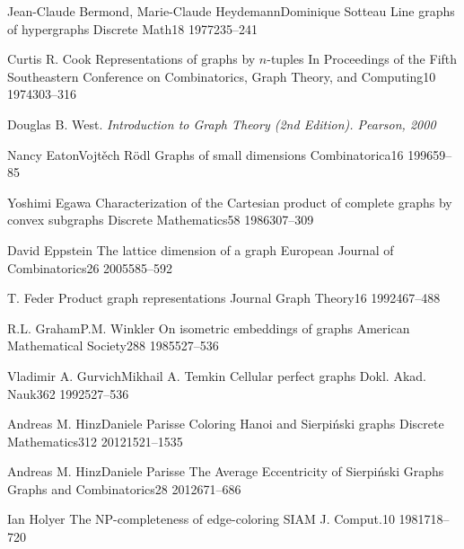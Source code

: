 \documentclass[12pt,a4paper,titlepage,openany]{report}
\begin{document}
 \begin{thebibliography}{99}
\thispagestyle{fancy}

  \articleInJournalManyAuthors
    {Jean-Claude Bermond, Marie-Claude Heydemann}{Dominique Sotteau}
    {Line graphs of hypergraphs}
   {Discrete Math}{18}
   {1977}{235--241} 


  \articleInJournalOneAuthor
    {Curtis R. Cook}
    {Representations of graphs by $n$-tuples}
   {In Proceedings of the Fifth Southeastern Conference on Combinatorics, Graph Theory, and Computing}{10}
   {1974}{303--316}
   
  Douglas B. West. \textit{Introduction to Graph Theory (2nd Edition). Pearson, 2000}

  \articleInJournalManyAuthors
    {Nancy Eaton}{Vojt\v ech R\" odl}
    {Graphs of small dimensions}
   {Combinatorica}{16}
   {1996}{59--85}

  \articleInJournalOneAuthor
    {Yoshimi Egawa}
    {Characterization of the Cartesian product of complete graphs by convex subgraphs}
   {Discrete Mathematics}{58}
   {1986}{307--309}     

\articleInJournalOneAuthor
    {David Eppstein}
    {The lattice dimension of a graph}
   {European Journal of Combinatorics}{26}
   {2005}{585--592} 

\articleInJournalOneAuthor
    {T. Feder}
    {Product graph representations}
   {Journal Graph Theory}{16}
   {1992}{467--488}

  \articleInJournalManyAuthors
    {R.L. Graham}{P.M. Winkler}
    {On isometric embeddings of graphs}
   {American Mathematical Society}{288}
   {1985}{527--536}

  \articleInJournalManyAuthors
    {Vladimir A. Gurvich}{Mikhail A. Temkin}
    {Cellular perfect graphs}
   {Dokl. Akad. Nauk}{362}
   {1992}{527--536}

  \articleInJournalManyAuthors
    {Andreas M. Hinz}{Daniele Parisse}
    {Coloring Hanoi and Sierpiński graphs}
   {Discrete Mathematics}{312}
   {2012}{1521--1535}  

  \articleInJournalManyAuthors
    {Andreas M. Hinz}{Daniele Parisse}
    {The Average Eccentricity of Sierpi\' nski Graphs}
   {Graphs and Combinatorics}{28}
   {2012}{671--686}

\articleInJournalOneAuthor
    {Ian Holyer}
    {The NP-completeness of edge-coloring}
   {SIAM J. Comput.}{10}
   {1981}{718--720}  


\end{thebibliography}
\end{document}
